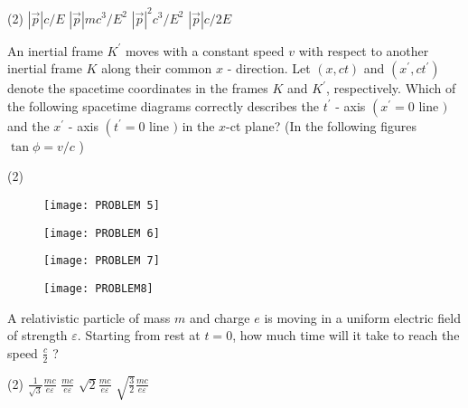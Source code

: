 \begin{enumerate}
\begin{minipage}{\textwidth}
\end{minipage}
\begin{tasks}(2)
	\task[\textbf{A.}] $|\vec{p}| c / E$
	\task[\textbf{B.}]$|\vec{p}| m c^{3} / E^{2}$
	\task[\textbf{C.}] $|\vec{p}|^{2} c^{3} / E^{2}$
	\task[\textbf{D.}]$|\vec{p}| c / 2 E$
\end{tasks}
\begin{minipage}{\textwidth}
	\item An inertial frame $K^{\prime}$ moves with a constant speed $v$ with respect to another inertial frame $K$ along their common $x$ - direction. Let $(x, c t)$ and $\left(x^{\prime}, c t^{\prime}\right)$ denote the spacetime coordinates in the frames $K$ and $K^{\prime}$, respectively. Which of the following spacetime diagrams correctly describes the $t^{\prime}$ - axis $\left(x^{\prime}=0\right.$ line $)$ and the $x^{\prime}$ - axis $\left(t^{\prime}=0\right.$ line $)$ in the $x$-ct plane? (In the following figures $\tan \phi=v / c$ )
\end{minipage}
\begin{tasks}(2)
	\task[\textbf{A.}]\begin{figure}[H]
		\centering
		\texttt{[image: PROBLEM 5]}
	\end{figure}
	\task[\textbf{B.}]\begin{figure}[H]
		\centering
		\texttt{[image: PROBLEM 6]}
	\end{figure}
	\task[\textbf{C.}]\begin{figure}[H]
		\centering
		\texttt{[image: PROBLEM 7]}
	\end{figure}
	\task[\textbf{D.}]\begin{figure}[H]
		\centering
		\texttt{[image: PROBLEM8]}
	\end{figure}
\end{tasks}
\begin{minipage}{\textwidth}
	\item A relativistic particle of mass $m$ and charge $e$ is moving in a uniform electric field of strength $\varepsilon$. Starting from rest at $t=0$, how much time will it take to reach the speed $\frac{c}{2}$ ?
\end{minipage}
\begin{tasks}(2)
	\task[\textbf{A.}] $\frac{1}{\sqrt{3}} \frac{m c}{e \varepsilon}$
	\task[\textbf{B.}]$\frac{m c}{e \varepsilon}$
	\task[\textbf{C.}]$\sqrt{2} \frac{m c}{e \varepsilon}$
	\task[\textbf{D.}]$\sqrt{\frac{3}{2}} \frac{m c}{e \varepsilon}$
\end{tasks}
\end{enumerate}
